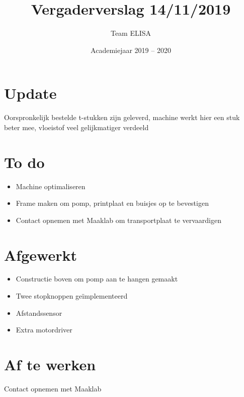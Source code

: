 \documentclass[a4paper,kulak]{kulakarticle} %
\date{Academiejaar 2019 -- 2020}
\title{Vergaderverslag 14/11/2019}
\author{Team ELISA}
\begin{document}
	
	\maketitle
	
	\section*{Update}
	Oorspronkelijk bestelde t-stukken zijn geleverd, machine werkt hier een stuk beter mee, vloeistof veel gelijkmatiger verdeeld
	\section*{To do}
	
	\begin{itemize}
		\item Machine optimaliseren
		\item Frame maken om pomp, printplaat en buisjes op te bevestigen
		\item Contact opnemen met Maaklab om transportplaat te vervaardigen
		
	\end{itemize}
	
	\section*{Afgewerkt}
		\begin{itemize}
			\item Constructie boven om pomp aan te hangen gemaakt
			\item Twee stopknoppen geïmplementeerd
			\item Afstandssensor
			\item Extra motordriver
		\end{itemize}
	
	
	\section*{Af te werken}
	Contact opnemen met Maaklab
	
\end{document}
